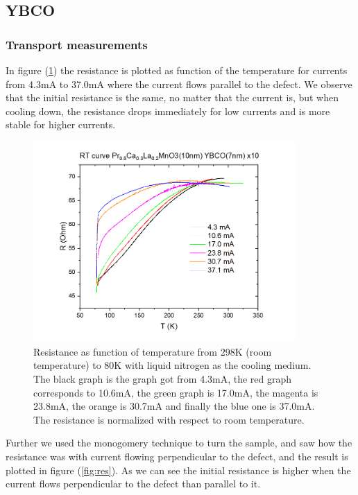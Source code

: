 \documentclass{comjnl}
\begin{document}
\subsection{YBCO}
\subsubsection{Transport measurements}
In figure (\ref{fig:res_norm}) the resistance is plotted as function of the temperature for currents from 4.3mA to 37.0mA where the current flows parallel to the defect. We observe that the initial resistance is the same, no matter that the current is, but when cooling down, the resistance drops immediately for low currents and is more stable for higher currents. 
\begin{figure}[h]
\centering
\includegraphics[width=100mm]{Bilde1.png}
\caption{Resistance as function of temperature from 298K (room temperature) to 80K with liquid nitrogen as the cooling medium. The black graph is the graph got from 4.3mA, the red graph corresponds to 10.6mA, the green graph is 17.0mA, the magenta is 23.8mA, the orange is 30.7mA and finally the blue one is 37.0mA. The resistance is normalized with respect to room temperature. \label{fig:res_norm}}
\end{figure}
Further we used the monogomery technique to turn the sample, and saw how the resistance was with current flowing perpendicular to the defect, and the result is plotted in figure (\ref{fig:res}). As we can see the initial resistance is higher when the current flows perpendicular to the defect than parallel to it. 
\end{document}
